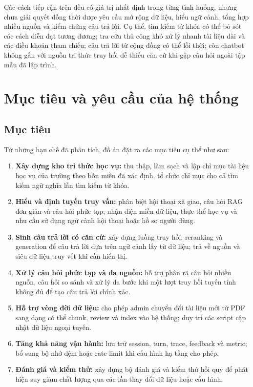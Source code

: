 \documentclass[../DoAn.tex]{subfiles}
\begin{document}
Các cách tiếp cận trên đều có giá trị nhất định trong từng tình huống, nhưng
chưa giải quyết đồng thời được yêu cầu mở rộng dữ liệu, hiểu ngữ cảnh, tổng
hợp nhiều nguồn và kiểm chứng câu trả lời. Cụ thể, tìm kiếm từ khóa có thể bỏ
sót các cách diễn đạt tương đương; tra cứu thủ công khó xử lý nhanh tài liệu
dài và các điều khoản tham chiếu; câu trả lời từ cộng đồng có thể lỗi thời;
còn chatbot không gắn với nguồn tri thức truy hồi dễ thiếu căn cứ khi gặp câu
hỏi ngoài tập mẫu đã lập trình.

\section{Mục tiêu và yêu cầu của hệ thống}
\label{sec:muctieu}

\subsection{Mục tiêu}

Từ những hạn chế đã phân tích, đồ án đặt ra các mục tiêu cụ thể như sau:

\begin{enumerate}
    \item \textbf{Xây dựng kho tri thức học vụ:} thu thập, làm sạch và lập
    chỉ mục tài liệu học vụ của trường theo bốn miền đã xác định, tổ chức
    chỉ mục cho cả tìm kiếm ngữ nghĩa lẫn tìm kiếm từ khóa.

    \item \textbf{Hiểu và định tuyến truy vấn:} phân biệt hội thoại xã giao,
    câu hỏi RAG đơn giản và câu hỏi phức tạp; nhận diện miền dữ liệu, thực thể
    học vụ và nhu cầu sử dụng ngữ cảnh hội thoại hoặc hồ sơ người dùng.

    \item \textbf{Sinh câu trả lời có căn cứ:} xây dựng luồng truy hồi,
    reranking và generation để câu trả lời dựa trên ngữ cảnh lấy từ dữ liệu;
    trả về nguồn và siêu dữ liệu truy vết khi cần hiển thị.

    \item \textbf{Xử lý câu hỏi phức tạp và đa nguồn:} hỗ trợ phân rã câu hỏi
    nhiều nguồn, câu hỏi so sánh và xử lý đa bước khi một lượt truy hồi tuyến
    tính không đủ để tạo câu trả lời chính xác.

    \item \textbf{Hỗ trợ vòng đời dữ liệu:} cho phép admin chuyển đổi tài liệu
    mới từ PDF sang dạng có thể chunk, review và index vào hệ thống; duy trì
    các script cập nhật dữ liệu ngoại tuyến.

    \item \textbf{Tăng khả năng vận hành:} lưu trữ session, turn, trace, feedback
    và metric; bổ sung bộ nhớ đệm hoặc rate limit khi cấu hình hạ tầng cho phép.

    \item \textbf{Đánh giá và kiểm thử:} xây dựng bộ đánh giá và kiểm thử hồi
    quy để phát hiện suy giảm chất lượng qua các lần thay đổi dữ liệu hoặc cấu
    hình.
\end{enumerate}
\end{document}
